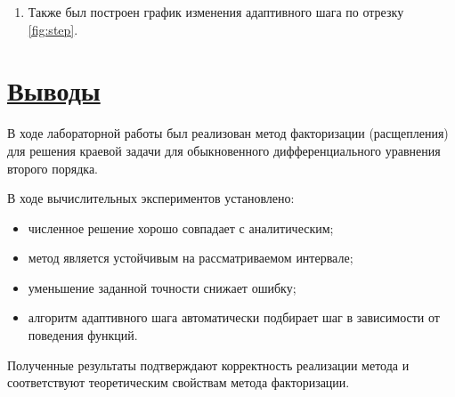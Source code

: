 \documentclass[14pt]{extarticle}
\begin{document}
\begin{enumerate}[label*=\arabic*), align=left, leftmargin=*, itemindent=1.5em, listparindent=1.5em, parsep=0pt]
		Точность решения краевой задачи достигается по классическому правилу Рунге: шаг сетки последовательно уменьшается вдвое до тех пор, пока оценка погрешности по двум вложенным сеткам не удовлетворит условию $\frac{\max |y_{h/2} - y_h|}{15} \le \varepsilon$. Фактическая максимальная погрешность решения монотонно убывает пропорционально $\varepsilon$ и располагается строго под эталонной биссектрисой $y = \varepsilon$, что подтверждает достижение требуемой точности решения.
		
		\item Также был построен график изменения адаптивного шага по отрезку \eqref{fig:step}.

	\end{enumerate}
	
	
	\newpage
	\section{\Large \underline{Выводы}}
	
	В ходе лабораторной работы был реализован
	метод факторизации (расщепления)
	для решения краевой задачи
	для обыкновенного дифференциального уравнения
	второго порядка.
	
	В ходе вычислительных экспериментов установлено:
	
	\begin{itemize}
		\item численное решение хорошо совпадает
		с аналитическим;
		\item метод является устойчивым
		на рассматриваемом интервале;
		\item уменьшение заданной точности
		снижает ошибку;
		\item алгоритм адаптивного шага автоматически
		подбирает шаг в зависимости от поведения функций.
	\end{itemize}
	
	Полученные результаты подтверждают
	корректность реализации метода
	и соответствуют теоретическим свойствам
	метода факторизации.
	
\end{document}
